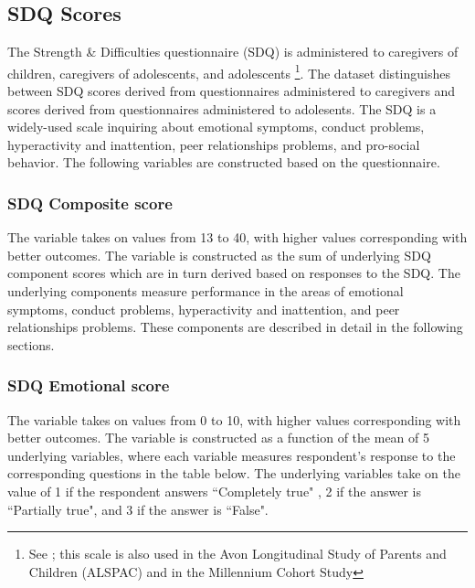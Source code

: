 \subsection{SDQ Scores}
The  Strength \& Difficulties questionnaire (SDQ) is administered to caregivers of children, caregivers of adolescents, and adolescents \footnote{See \cite{Goodman_1997_JCPP}; this scale is also used in the Avon Longitudinal
Study of Parents and Children (ALSPAC) and in the Millennium Cohort Study}. The dataset distinguishes between SDQ scores derived from questionnaires administered to caregivers and scores derived from questionnaires administered to adolesents. The SDQ is a widely-used scale inquiring about emotional symptoms, conduct problems, hyperactivity and inattention, peer relationships problems, and pro-social behavior. The following variables are constructed based on the questionnaire.

\subsubsection{SDQ Composite score}
The variable takes on values from 13 to 40, with higher values corresponding with better outcomes. The variable is constructed as the sum of underlying SDQ component scores which are in turn derived based on responses to the SDQ. The underlying components measure performance in the areas of emotional symptoms, conduct problems, hyperactivity and inattention, and peer relationships problems. These components are described in detail in the following sections.

\subsubsection{SDQ Emotional score}
The variable takes on values from 0 to 10, with higher values corresponding with better outcomes. The variable is constructed as a function of the mean of 5 underlying variables, where each variable measures respondent's response to the corresponding questions in the table below. The underlying variables take on the value of 1 if the respondent answers  ``Completely true" , 2 if the answer is ``Partially true", and 3 if the answer is ``False". \\

